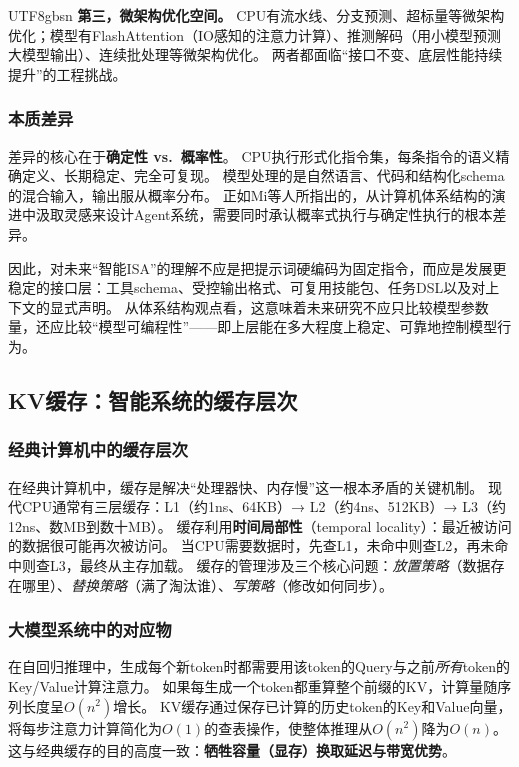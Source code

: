 \documentclass[11pt,a4paper]{article}
\begin{document}
\begin{CJK*}{UTF8}{gbsn}
\textbf{第三，微架构优化空间。}
CPU有流水线、分支预测、超标量等微架构优化；模型有FlashAttention（IO感知的注意力计算\cite{dao2022flashattention}）、推测解码（用小模型预测大模型输出\cite{leviathan2023speculative}）、连续批处理等微架构优化。
两者都面临``接口不变、底层性能持续提升''的工程挑战。

\subsubsection{本质差异}

差异的核心在于\textbf{确定性 vs.\ 概率性}。
CPU执行形式化指令集，每条指令的语义精确定义、长期稳定、完全可复现。
模型处理的是自然语言、代码和结构化schema的混合输入，输出服从概率分布。
正如Mi等人所指出的，从计算机体系结构的演进中汲取灵感来设计Agent系统，需要同时承认概率式执行与确定性执行的根本差异\cite{mi2025llmagentscomputersystems}。

因此，对未来``智能ISA''的理解不应是把提示词硬编码为固定指令，而应是发展更稳定的接口层：工具schema、受控输出格式、可复用技能包、任务DSL以及对上下文的显式声明。
从体系结构观点看，这意味着未来研究不应只比较模型参数量，还应比较``模型可编程性''——即上层能在多大程度上稳定、可靠地控制模型行为。

\subsection{KV缓存：智能系统的缓存层次}
\label{sec:kv}

\subsubsection{经典计算机中的缓存层次}

在经典计算机中，缓存是解决``处理器快、内存慢''这一根本矛盾的关键机制\cite{drepper2007memory}。
现代CPU通常有三层缓存：L1（约1ns、64KB）→ L2（约4ns、512KB）→ L3（约12ns、数MB到数十MB）。
缓存利用\textbf{时间局部性}（temporal locality）：最近被访问的数据很可能再次被访问。
当CPU需要数据时，先查L1，未命中则查L2，再未命中则查L3，最终从主存加载。
缓存的管理涉及三个核心问题：\textit{放置策略}（数据存在哪里）、\textit{替换策略}（满了淘汰谁）、\textit{写策略}（修改如何同步）。

\subsubsection{大模型系统中的对应物}

在自回归推理中，生成每个新token时都需要用该token的Query与之前\textit{所有}token的Key/Value计算注意力。
如果每生成一个token都重算整个前缀的KV，计算量随序列长度呈$O(n^2)$增长。
KV缓存通过保存已计算的历史token的Key和Value向量，将每步注意力计算简化为$O(1)$的查表操作，使整体推理从$O(n^2)$降为$O(n)$。
这与经典缓存的目的高度一致：\textbf{牺牲容量（显存）换取延迟与带宽优势}\cite{drepper2007memory,kwon2023pagedattention}。


\end{CJK*}
\end{document}

